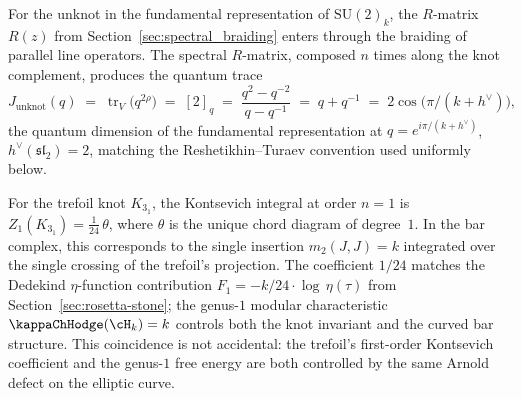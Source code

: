 For the unknot in the fundamental representation of $\mathrm{SU}(2)_k$,
the $R$-matrix $R(z)$ from Section~\ref{sec:spectral_braiding}
enters through the braiding of parallel line operators. The
spectral $R$-matrix, composed $n$ times along the knot complement,
produces the quantum trace
\[
J_{\text{unknot}}(q) \;=\; \operatorname{tr}_V\bigl(q^{2\rho}\bigr)
\;=\; [2]_q \;=\; \frac{q^{2}-q^{-2}}{q-q^{-1}} \;=\; q + q^{-1}
\;=\; 2\cos\!\bigl(\pi/(k+h^\vee)\bigr),
\]
the quantum dimension of the fundamental representation at
$q = e^{i\pi/(k+h^\vee)}$, $h^\vee(\mathfrak{sl}_2)=2$, matching
the Reshetikhin--Turaev convention used uniformly below.

\begin{remark}
\label{rem:trefoil}
For the trefoil knot $K_{3_1}$, the Kontsevich integral at order
$n = 1$ is
$Z_1(K_{3_1}) = \frac{1}{24}\,\theta$,
where $\theta$ is the unique chord diagram of degree~$1$.
In the bar complex, this corresponds to the single insertion
$m_2(J, J) = k$ integrated over the single crossing of the
trefoil's projection. The coefficient $1/24$ matches the
Dedekind $\eta$-function contribution
$F_1 = -k/24 \cdot \log\,\eta(\tau)$ from
Section~\ref{sec:rosetta-stone}; the genus-$1$ modular
characteristic $\kappaChHodge(\cH_k) = k$ controls both the knot
invariant and the curved bar structure. This coincidence is not
accidental: the trefoil's first-order Kontsevich coefficient and
the genus-$1$ free energy are both controlled by the same
Arnold defect on the elliptic curve.
\end{remark}

